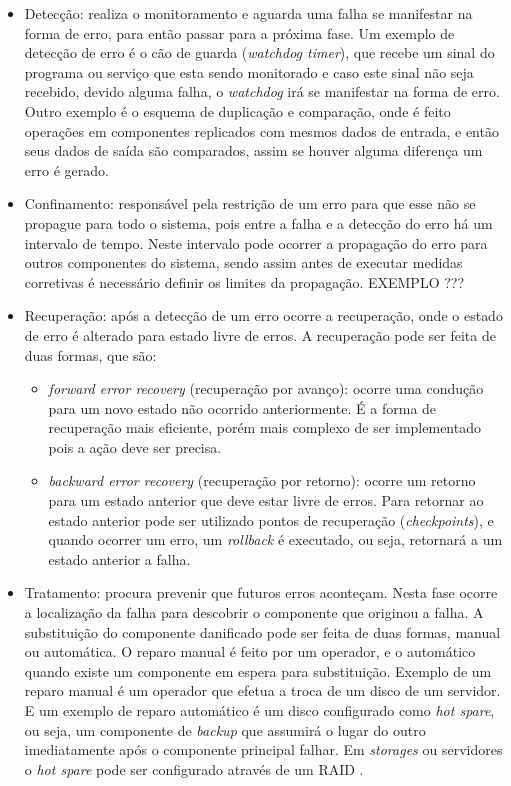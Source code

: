 \begin{itemize}
 \item Detecção: realiza o monitoramento e aguarda uma falha se manifestar na forma de erro, para então passar para a próxima fase. 
 Um exemplo de detecção de erro é o cão de guarda (\textit{watchdog timer}), que recebe um sinal do programa ou serviço que esta sendo 
 monitorado e caso este sinal não seja recebido, devido alguma falha, o \textit{watchdog} irá se manifestar na forma de erro. 
 Outro exemplo é o esquema de duplicação e comparação, onde é feito operações em componentes replicados com mesmos dados de entrada, e então
 seus dados de saída são comparados, assim se houver alguma diferença um erro é gerado.
 \item Confinamento: responsável pela restrição de um erro para que esse não se propague para todo o sistema, pois entre a falha e a
 detecção do erro há um intervalo de tempo. Neste intervalo pode ocorrer a propagação do erro para outros componentes do sistema, sendo assim 
 antes de executar medidas corretivas é necessário definir os limites da propagação. EXEMPLO ???
 \item Recuperação: após a detecção de um erro ocorre a recuperação, onde o estado de erro é alterado para estado livre de erros. A recuperação
 pode ser feita de duas formas, que são:
 \begin{itemize}
  \item \textit{forward error recovery} (recuperação por avanço): ocorre uma condução para um novo estado não ocorrido anteriormente. É a forma
  de recuperação mais eficiente, porém mais complexo de ser implementado pois a ação deve ser precisa.
  \item \textit{backward error recovery} (recuperação por retorno): ocorre um retorno para um estado anterior que deve estar livre de erros.
  Para retornar ao estado anterior pode ser utilizado pontos de recuperação (\textit{checkpoints}), e quando ocorrer um erro, um \textit{rollback} 
  é executado, ou seja, retornará a um estado anterior a falha.
 \end{itemize}
 \item Tratamento: procura prevenir que futuros erros aconteçam. Nesta fase ocorre a localização da falha para descobrir o 
 componente que originou a falha. A substituição do componente danificado pode ser feita de duas formas, manual ou automática. 
 O reparo manual é feito por um operador, e o automático quando existe um componente em espera para substituição. Exemplo de um reparo 
 manual é um operador que efetua a troca de um disco de um servidor. E um exemplo de reparo automático é um disco configurado como 
 \textit{hot spare}, ou seja, um componente de \textit{backup} que assumirá o lugar do outro imediatamente após o componente principal 
 falhar. Em \textit{storages} ou servidores o \textit{hot spare} pode ser configurado através de um \ac{RAID} \cite{rouse2013}.
\end{itemize}

